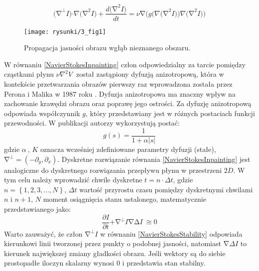 \documentclass[12pt, twoside, openany]{report}
\theoremstyle{definition}
\begin{document}
\begin{equation}
{\mathrm{(}\mathrm{\nabla }}^{\mathrm{\bot }}I\mathrm{)}\mathrm{\cdot }\nabla {\mathrm{(}\mathrm{\nabla }}^{\mathrm{2}}I\mathrm{)+}\frac{d{\mathrm{(}\mathrm{\nabla }}^{\mathrm{2}}I\mathrm{)}}{dt}\mathrm{=}\nu \mathrm{\nabla }\mathrm{(}g\mathrm{(}\nabla {\mathrm{(}\mathrm{\nabla }}^{\mathrm{2}}I\mathrm{))}\nabla {\mathrm{(}\mathrm{\nabla }}^{\mathrm{2}}I\mathrm{))} 
\label{NavierStokesInpainting}
\end{equation}
\begin{figure}[!h]
	\centering
	\texttt{[image: rysunki/3\_fig1]}
	\caption{Propagacja jasności obrazu wgłąb nieznanego obszaru.}
	\label{3_fig1}
\end{figure}
W równaniu \eqref{NavierStokesInpainting} człon odpowiedzialny za tarcie pomiędzy cząstkami płynu $\nu {\nabla }^2V\ $ został zastąpiony dyfuzją anizotropową, która w kontekście przetwarzania obrazów pierwszy raz wprowadzona została przez Perona i Malika w 1987 roku \cite{perona1990scale}. Dyfuzja anizotropowa ma znaczny wpływ na zachowanie krawędzi obrazu oraz poprawę jego ostrości. Za dyfuzję anizotropową odpowiada współczynnik $g$, który przedstawiany jest w różnych postaciach funkcji przewodności. W publikacji \cite{au2001image} autorzy wykorzystują postać:
\begin{equation}
g\left(s\right)=\frac{1}{1+\alpha \left|s\right|}
\end{equation}
gdzie $\alpha\ $, $K$ oznacza wcześniej zdefiniowane parametry dyfuzji (stałe), ${\mathrm{\nabla }}^{\bot }=({-\partial }_y,{\partial }_x)$. 
Dyskretne rozwiązanie równania \eqref{NavierStokesInpainting} jest analogiczne do dyskretnego rozwiązania przepływu płynu w przestrzeni $2D$. W tym celu należy wprowadzić chwile dyskretne $t=n\cdot \Delta t$, gdzie $n=\left\{1,2,3,\dots ,N\right\}$, $\Delta t$ wartość przyrostu czasu pomiędzy dyskretnymi chwilami $n$ i $n+1$, $N$ moment osiągnięcia stanu ustalonego, matematycznie przedstawianego jako:
\begin{equation}
\frac{\partial I}{\partial t}\mathrm{+}{\mathrm{\nabla }}^{\mathrm{\bot }}I\mathrm{\nabla }\mathrm{\Delta }I\mathrm{\ }\mathrm{\cong }\mathrm{0}
\label{NavierStokesStability}
\end{equation}
Warto zauważyć, że człon ${\mathrm{\nabla }}^{\bot }I$ w równaniu \eqref{NavierStokesStability} odpowiada kierunkowi linii tworzonej przez punkty o podobnej jasności, natomiast $\mathrm{\nabla }\Delta I$ to kierunek największej zmiany gładkości obrazu. Jeśli wektory są do siebie prostopadłe  iloczyn skalarny wynosi 0 i przedstawia stan stabilny. 
\end{document}
